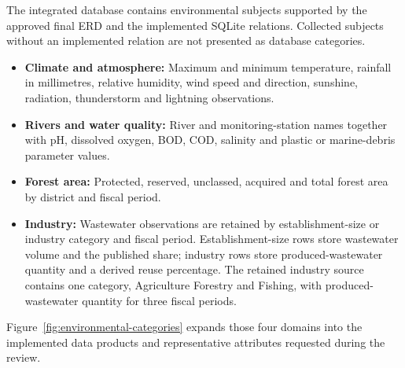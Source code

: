 The integrated database contains environmental subjects supported by the
approved final ERD and the implemented SQLite relations. Collected subjects
without an implemented relation are not presented as database categories.

\begin{itemize}[leftmargin=*,nosep]
  \item \textbf{Climate and atmosphere:} Maximum and minimum temperature,
  rainfall in millimetres, relative humidity, wind speed and direction,
  sunshine, radiation, thunderstorm and lightning observations.
  \item \textbf{Rivers and water quality:} River and monitoring-station names
  together with pH, dissolved oxygen, BOD, COD, salinity and plastic or
  marine-debris parameter values.
  \item \textbf{Forest area:} Protected, reserved, unclassed, acquired and
  total forest area by district and fiscal period.
  \item \textbf{Industry:} Wastewater observations are retained by
  establishment-size or industry category and fiscal period.
  Establishment-size rows store wastewater volume and the published share;
  industry rows store produced-wastewater quantity and a derived reuse
  percentage. The retained industry source contains one category, Agriculture
  Forestry and Fishing, with produced-wastewater quantity for three fiscal
  periods.
\end{itemize}

Figure~\ref{fig:environmental-categories} expands those four domains into the
implemented data products and representative attributes requested during the
review.

